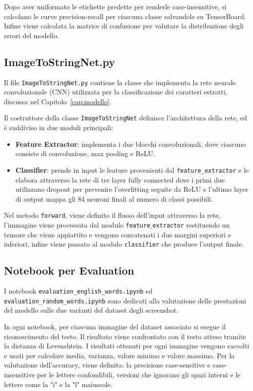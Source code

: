 Dopo aver uniformato le etichette predette per renderle case-insensitive, si calcolano le curve precision-recall per ciascuna classe salvandole su TensorBoard. Infine viene calcolata la matrice di confusione per valutare la distribuzione degli errori del modello.
\subsection{ImageToStringNet.py}
Il file \texttt{ImageToStringNet.py} contiene la classe che implementa la rete neurale convoluzionale (CNN) utilizzata per la classificazione dei caratteri estratti, discussa nel Capitolo~\ref{cap:modello}. 

Il costruttore della classe \texttt{ImageToStringNet} definisce l'architettura della rete, ed è suddiviso in due moduli principali:
\begin{itemize}
    \item \textbf{Feature Extractor}: implementa i due blocchi convoluzionali, dove ciascuno consiste di convoluzione, max pooling e ReLU.
    \item \textbf{Classifier}: prende in input le feature provenienti dal \texttt{feature\_extractor} e le elabora attraverso la rete di tre layer fully connected dove i primi due utilizzano dropout per prevenire l'overfitting seguite da ReLU e l'ultimo layer di output mappa gli 84 neuroni finali al numero di classi possibili.
\end{itemize}

Nel metodo \texttt{forward}, viene definito il flusso dell'input attraverso la rete, l'immagine viene processata dal modulo \texttt{feature$\_$extractor} restituendo un tensore che viene appiattito e vengono concatenati i due margini superiori e inferiori, infine viene passato al modulo \texttt{classifier} che produce l'output finale.

\subsection{Notebook per Evaluation}
I notebook \texttt{evaluation\_english\_words.ipynb} ed \\  \texttt{evaluation\_random\_words.ipynb} sono dedicati alla valutazione delle prestazioni del modello sulle due varianti del dataset degli screenshot. 

In ogni notebook, per ciascuna immagine del dataset associato si esegue il riconoscimento del testo. Il risultato viene confrontato con il testo atteso tramite la distanza di Levenshtein. I risultati ottenuti per ogni immagine vengono raccolti e usati per calcolare media, varianza, valore minimo e valore massimo. Per la valutazione dell'accuracy, viene definita: la precisione case-sensitive e case-insensitive per le lettere confondibili, versioni che ignorano gli spazi interni e le lettere come la "i" e la "l" maiuscole.


